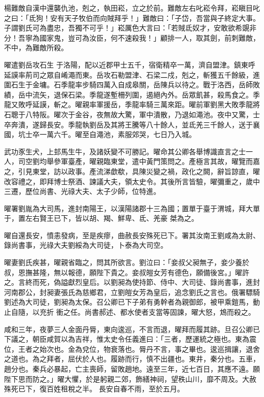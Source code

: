 \begin{pinyinscope}
 楊難敵自漢中還襲仇池，剋之，執田崧，立之於前。難敵左右叱崧令拜，崧瞋目叱之曰：「氐狗！安有天子牧伯而向賊拜乎！」難敵曰：「子岱，吾當與子終定大事。子謂劉氏可為盡忠，吾獨不可乎！」崧厲色大言曰：「若賊氐奴才，安敢欲希覬非分！吾寧為國家鬼，豈可為汝臣，何不速殺我！」顧排一人，取其劍，前刺難敵，不中，為難敵所殺。



 曜遣劉岳攻石生
 于洛陽，配以近郡甲士五千，宿衛精卒一萬，濟自盟津。鎮東呼延謨率荊司之眾自崤澠而東。岳攻石勒盟津、石梁二戍，剋之，斬獲五千餘級，進圍石生于金墉。石季龍率步騎四萬入自成皋關，岳陳兵以待之。戰于洛西，岳師敗績，岳中流矢，退保石梁。季龍遂塹柵列圍，遏絕內外。岳眾飢甚，殺馬食之。季龍又敗呼延謨，斬之。曜親率軍援岳，季龍率騎三萬來距。曜前軍劉黑大敗季龍將石聰于八特阪。曜次于金谷，夜無故大驚，軍中潰散，乃退如澠池。夜中又驚，士卒奔潰，遂歸長安。季龍執劉岳及其將王騰等八十餘人，並氐羌三千餘人，送于襄
 國，坑士卒一萬六千。曜至自澠池，素服郊哭，七日乃入城。



 武功豕生犬，上邽馬生牛，及諸妖變不可勝記。曜命其公卿各舉博識直言之士一人，司空劉均舉參軍臺產，曜親臨東堂，遣中黃門策問之。產極言其故，曜覽而嘉之，引見東堂，訪以政事。產流涕歔欷，具陳災變之禍，政化之闕，辭旨諒直，曜改容禮之，即拜博士祭酒、諫議大夫，領太史令。其後所言皆驗，曜彌重之，歲中三遷，歷位尚書、光祿大夫、太子少師，位特進。



 曜署劉胤為大司馬，進封南陽王，以漢陽諸郡十三為國；置單于臺于渭城，拜大單于，置左右賢王已下，皆以胡、羯、鮮卑、氐、羌豪
 桀為之。



 曜自還長安，憤恚發病，至是疾瘳，曲赦長安殊死已下。署其汝南王劉咸為太尉、錄尚書事，光祿大夫劉綏為大司徒，卜泰為大司空。



 曜妻劉氏疾甚，曜親省臨之，問其所欲言。劉泣曰：「妾叔父昶無子，妾少養於叔，恩撫甚隆，無以報德，願陛下貴之。妾叔皚女芳有德色，願備後宮。」曜許之。言終而死，偽謚獻烈皇后。以劉昶為使持節、侍中、大司徒、錄尚書事，進封河南郡公，封昶妻張氏為慈鄉君，立劉皚女芳為皇后，追念劉氏之言也。俄署驃騎劉述為大司徒，劉昶為太保。召公卿已下子弟有勇幹者為親御郎，被甲乘鎧馬，動止自隨，以充折
 衝之任。尚書郝述、都水使者支當等固諫，曜大怒，鴆而殺之。



 咸和三年，夜夢三人金面丹脣，東向逡巡，不言而退，曜拜而履其跡。旦召公卿已下議之，朝臣咸賀以為吉祥，惟太史令任義進曰：「三者，歷運統之極也。東為震位，王者之始次也。金為兌位，物衰落也。脣丹不言，事之畢也。逡巡揖讓，退舍之道也。為之拜者，屈伏於人也。履跡而行，慎不出疆也。東井，秦分也。五車，趙分也。秦兵必暴起，亡主喪師，留敗趙地。遠至三年，近七百日，其應不遠。願陛下思而防之。」曜大懼，於是躬親二郊，飾繕神祠，望秩山川，靡不周及。大赦殊死已下，復百姓租稅之半。
 長安自春不雨，至於五月。




\end{pinyinscope}
